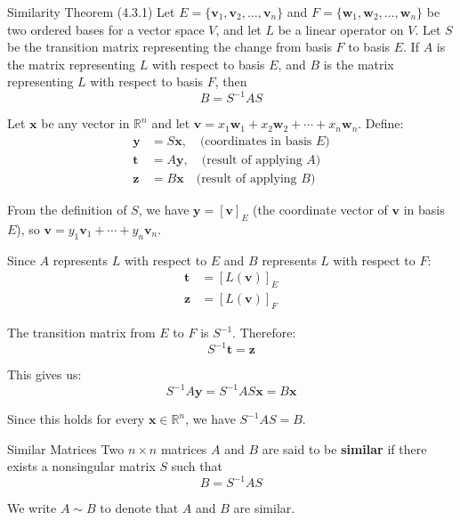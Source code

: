 \documentclass[12pt,a4paper]{article}
\newcommand{\R}{\mathbb{R}}
\newcommand{\vv}[1]{\mathbf{#1}}
\begin{document}
	\begin{theorem}{Similarity Theorem (4.3.1)}
		Let $E = \{\vv{v}_1, \vv{v}_2, \ldots, \vv{v}_n\}$ and $F = \{\vv{w}_1, \vv{w}_2, \ldots, \vv{w}_n\}$ be two ordered bases for a vector space $V$, and let $L$ be a linear operator on $V$. Let $S$ be the transition matrix representing the change from basis $F$ to basis $E$. If $A$ is the matrix representing $L$ with respect to basis $E$, and $B$ is the matrix representing $L$ with respect to basis $F$, then
		\[
		B = S^{-1}AS
		\]
	\end{theorem}
	
	\begin{proofbox}
		
		Let $\vv{x}$ be any vector in $\R^n$ and let $\vv{v} = x_1\vv{w}_1 + x_2\vv{w}_2 + \cdots + x_n\vv{w}_n$. Define:
		\begin{align*}
			\vv{y} &= S\vv{x}, \quad \text{(coordinates in basis $E$)} \\
			\vv{t} &= A\vv{y}, \quad \text{(result of applying $A$)} \\
			\vv{z} &= B\vv{x} \quad \text{(result of applying $B$)}
		\end{align*}
		
		From the definition of $S$, we have $\vv{y} = [\vv{v}]_E$ (the coordinate vector of $\vv{v}$ in basis $E$), so $\vv{v} = y_1\vv{v}_1 + \cdots + y_n\vv{v}_n$.
		
		Since $A$ represents $L$ with respect to $E$ and $B$ represents $L$ with respect to $F$:
		\begin{align*}
			\vv{t} &= [L(\vv{v})]_E \\
			\vv{z} &= [L(\vv{v})]_F
		\end{align*}
		
		The transition matrix from $E$ to $F$ is $S^{-1}$. Therefore:
		\[
		S^{-1}\vv{t} = \vv{z}
		\]
		
		This gives us:
		\[
		S^{-1}A\vv{y} = S^{-1}AS\vv{x} = B\vv{x}
		\]
		
		Since this holds for every $\vv{x} \in \R^n$, we have $S^{-1}AS = B$.
		
	\end{proofbox}
	
	\begin{definition}{Similar Matrices}
		Two $n \times n$ matrices $A$ and $B$ are said to be \textbf{similar} if there exists a nonsingular matrix $S$ such that
		\[
		B = S^{-1}AS
		\]
		
		We write $A \sim B$ to denote that $A$ and $B$ are similar.
	\end{definition}
	
\end{document}
